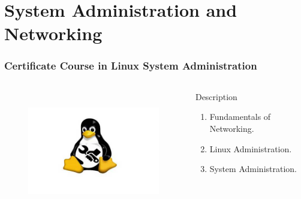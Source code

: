 \section{System Administration and Networking}
\begin{frame}
	\frametitle{{\large Certificate Course in Linux System Administration}}
		\begin{columns}
		
		
		\begin{figure}
			\includegraphics[width=180pt,height=150pt]{figures/course_lsa.jpg}
		\end{figure}
		
		
		\begin{block}{Description}
			
			\begin{enumerate}
				\item Fundamentals of Networking. 
				\item Linux Administration.
				\item System Administration.
			\end{enumerate}
			
		\end{block}
		
	\end{columns}
\end{frame}


